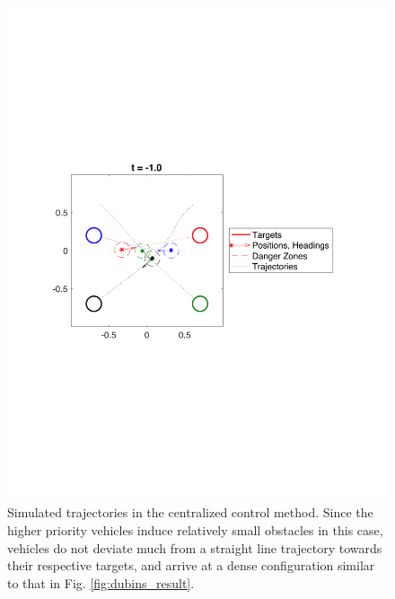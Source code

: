 \begin{figure}
  \centering
  \includegraphics[width=0.8\columnwidth]{fig/cc_traj}
  \caption{Simulated trajectories in the centralized control method. Since the higher priority vehicles induce relatively small obstacles in this case, vehicles do not deviate much from a straight line trajectory towards their respective targets, and arrive at a dense configuration similar to that in Fig. \ref{fig:dubins_result}.}
  \label{fig:cc_traj}
\end{figure}

